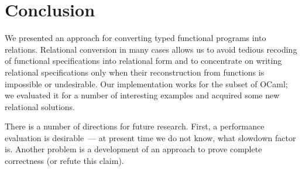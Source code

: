 \section{Conclusion}
\label{conclusion}

We presented an approach for converting typed functional programs into relations. Relational conversion 
in many cases allows us to avoid tedious recoding of functional specifications into relational form and to 
concentrate on writing relational specifications only when their reconstruction from functions is impossible or 
undesirable. Our implementation works for the subset of OCaml; we evaluated it for a number of interesting 
examples and acquired some new relational solutions.

There is a number of directions for future research. First, a performance evaluation is desirable~--- at
present time we do not know, what slowdown factor is. Another problem is a development of an approach to
prove complete correctness (or refute this claim).
